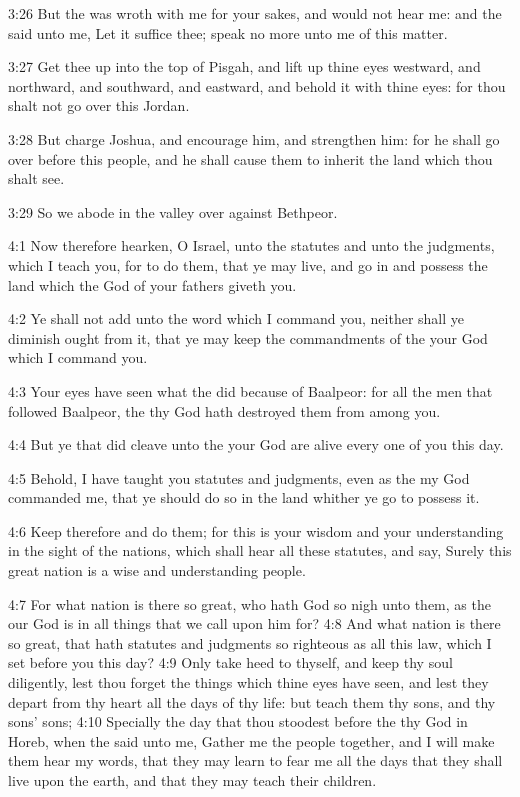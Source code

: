 3:26 But the \LORD was wroth with me for your sakes, and would not hear
me: and the \LORD said unto me, Let it suffice thee; speak no more unto
me of this matter.

3:27 Get thee up into the top of Pisgah, and lift up thine eyes
westward, and northward, and southward, and eastward, and behold it
with thine eyes: for thou shalt not go over this Jordan.

3:28 But charge Joshua, and encourage him, and strengthen him: for he
shall go over before this people, and he shall cause them to inherit
the land which thou shalt see.

3:29 So we abode in the valley over against Bethpeor.

4:1 Now therefore hearken, O Israel, unto the statutes and unto the
judgments, which I teach you, for to do them, that ye may live, and go
in and possess the land which the \LORD God of your fathers giveth you.

4:2 Ye shall not add unto the word which I command you, neither shall
ye diminish ought from it, that ye may keep the commandments of the
\LORD your God which I command you.

4:3 Your eyes have seen what the \LORD did because of Baalpeor: for all
the men that followed Baalpeor, the \LORD thy God hath destroyed them
from among you.

4:4 But ye that did cleave unto the \LORD your God are alive every one
of you this day.

4:5 Behold, I have taught you statutes and judgments, even as the \LORD
my God commanded me, that ye should do so in the land whither ye go to
possess it.

4:6 Keep therefore and do them; for this is your wisdom and your
understanding in the sight of the nations, which shall hear all these
statutes, and say, Surely this great nation is a wise and
understanding people.

4:7 For what nation is there so great, who hath God so nigh unto them,
as the \LORD our God is in all things that we call upon him for?  4:8
And what nation is there so great, that hath statutes and judgments so
righteous as all this law, which I set before you this day?  4:9 Only
take heed to thyself, and keep thy soul diligently, lest thou forget
the things which thine eyes have seen, and lest they depart from thy
heart all the days of thy life: but teach them thy sons, and thy sons'
sons; 4:10 Specially the day that thou stoodest before the \LORD thy
God in Horeb, when the \LORD said unto me, Gather me the people
together, and I will make them hear my words, that they may learn to
fear me all the days that they shall live upon the earth, and that
they may teach their children.

